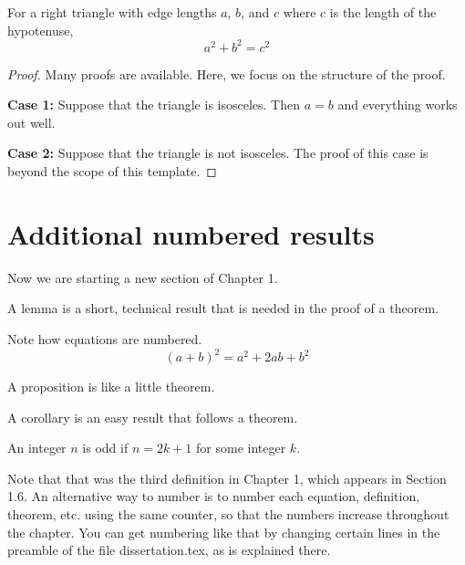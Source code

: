 \begin{theorem}
For a right triangle with edge lengths $a$, $b$, and $c$ where $c$ is the length of the hypotenuse, 
\begin{equation}
    a^2 + b^2 = c^2
\end{equation}
\end{theorem}
\begin{proof}
Many proofs are available.  Here, we focus on the structure of the proof.

\noindent
{\bf Case 1:} Suppose that the triangle is isosceles.
Then $a = b$ and everything works out well.

\noindent
{\bf Case 2:} Suppose that the triangle is not isosceles.
The proof of this case is beyond the scope of this template.
\end{proof}

\section{Additional numbered results}

Now we are starting a new section of Chapter 1.

\begin{lemma}
A lemma is a short, technical result that is needed in the proof of a theorem.
\end{lemma}

Note how equations are numbered.
\begin{equation}
    (a+b)^2 = a^2 + 2 ab + b^2
\end{equation}

\begin{proposition}
A proposition is like a little theorem.
\end{proposition}

\begin{corollary}
A corollary is an easy result that follows a theorem.
\end{corollary}

\begin{definition}
An integer $n$ is odd if $n=2k+1$ for some integer $k$.
\end{definition}

Note that that was the third definition in Chapter 1, which appears in Section 1.6.
An alternative way to number is to number each equation, definition, theorem, etc. using the same counter, so that the numbers increase throughout the chapter.
You can get numbering like that by changing certain lines in the preamble of the file dissertation.tex, as is explained there.
